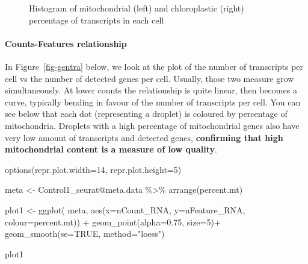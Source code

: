 \documentclass[
  letterpaper,
  DIV=11,
  numbers=noendperiod]{scrartcl}
\let\oldparagraph\paragraph
\renewcommand{\paragraph}[1]{\oldparagraph{#1}\mbox{}}
\newenvironment{Shaded}{}{}
\newcommand{\AttributeTok}[1]{\textcolor[rgb]{0.49,0.56,0.16}{#1}}
\newcommand{\ConstantTok}[1]{\textcolor[rgb]{0.53,0.00,0.00}{#1}}
\newcommand{\DecValTok}[1]{\textcolor[rgb]{0.25,0.63,0.44}{#1}}
\newcommand{\FloatTok}[1]{\textcolor[rgb]{0.25,0.63,0.44}{#1}}
\newcommand{\FunctionTok}[1]{\textcolor[rgb]{0.02,0.16,0.49}{#1}}
\newcommand{\NormalTok}[1]{#1}
\newcommand{\OtherTok}[1]{\textcolor[rgb]{0.00,0.44,0.13}{#1}}
\newcommand{\SpecialCharTok}[1]{\textcolor[rgb]{0.25,0.44,0.63}{#1}}
\newcommand{\StringTok}[1]{\textcolor[rgb]{0.25,0.44,0.63}{#1}}
\begin{document}
\begin{figure}[H]


\caption{\label{fig-mt}Histogram of mitochondrial (left) and
chloroplastic (right) percentage of transcripts in each cell}

\end{figure}%

\paragraph{Counts-Features
relationship}\label{counts-features-relationship}

In Figure~\ref{fig-gentra} below, we look at the plot of the number of
transcripts per cell vs the number of detected genes per cell. Usually,
those two measure grow simultaneously. At lower counts the relationship
is quite linear, then becomes a curve, typically bending in favour of
the number of transcripts per cell. You can see below that each dot
(representing a droplet) is coloured by percentage of mitochondria.
Droplets with a high percentage of mitochondrial genes also have very
low amount of transcripts and detected genes, \textbf{confirming that
high mitochondrial content is a measure of low quality}.

\begin{Shaded}
\begin{Highlighting}[]
\FunctionTok{options}\NormalTok{(}\AttributeTok{repr.plot.width=}\DecValTok{14}\NormalTok{, }\AttributeTok{repr.plot.height=}\DecValTok{5}\NormalTok{)}

\NormalTok{meta }\OtherTok{\textless{}{-}}\NormalTok{ Control1\_seurat}\SpecialCharTok{@}\NormalTok{meta.data }\SpecialCharTok{\%\textgreater{}\%} \FunctionTok{arrange}\NormalTok{(percent.mt)}

\NormalTok{plot1 }\OtherTok{\textless{}{-}} \FunctionTok{ggplot}\NormalTok{( meta, }\FunctionTok{aes}\NormalTok{(}\AttributeTok{x=}\NormalTok{nCount\_RNA, }\AttributeTok{y=}\NormalTok{nFeature\_RNA, }\AttributeTok{colour=}\NormalTok{percent.mt)) }\SpecialCharTok{+} 
         \FunctionTok{geom\_point}\NormalTok{(}\AttributeTok{alpha=}\FloatTok{0.75}\NormalTok{, }\AttributeTok{size=}\DecValTok{5}\NormalTok{)}\SpecialCharTok{+}
         \FunctionTok{geom\_smooth}\NormalTok{(}\AttributeTok{se=}\ConstantTok{TRUE}\NormalTok{, }\AttributeTok{method=}\StringTok{"loess"}\NormalTok{)}

\NormalTok{plot1}
\end{Highlighting}
\end{Shaded}
\end{document}
